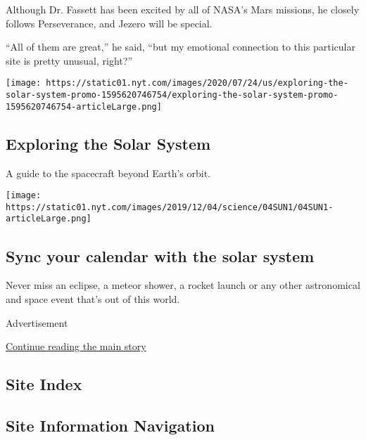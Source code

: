 Although Dr. Fassett has been excited by all of NASA's Mars missions, he
closely follows Perseverance, and Jezero will be special.

``All of them are great,'' he said, ``but my emotional connection to
this particular site is pretty unusual, right?''

\href{https://www.nytimes.com/interactive/2020/science/exploring-the-solar-system.html}{}

\texttt{[image: https://static01.nyt.com/images/2020/07/24/us/exploring-the-solar-system-promo-1595620746754/exploring-the-solar-system-promo-1595620746754-articleLarge.png]}

\hypertarget{exploring-the-solar-system}{%
\subsection{Exploring the Solar
System}\label{exploring-the-solar-system}}

A guide to the spacecraft beyond Earth's orbit.

\href{https://www.nytimes.com/interactive/2020/science/2020-astronomy-space-calendar.html}{}

\texttt{[image: https://static01.nyt.com/images/2019/12/04/science/04SUN1/04SUN1-articleLarge.png]}

\hypertarget{sync-your-calendar-with-the-solar-system}{%
\subsection{Sync your calendar with the solar
system}\label{sync-your-calendar-with-the-solar-system}}

Never miss an eclipse, a meteor shower, a rocket launch or any other
astronomical and space event that's out of this world.

Advertisement

\protect\hyperlink{after-bottom}{Continue reading the main story}

\hypertarget{site-index}{%
\subsection{Site Index}\label{site-index}}

\hypertarget{site-information-navigation}{%
\subsection{Site Information
Navigation}\label{site-information-navigation}}

